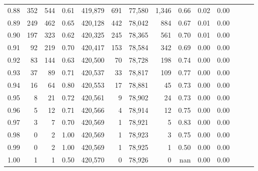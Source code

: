 \begin{tabular}{rrrrrrrrrrrrrr}
0.88 &     352 &    544 &  0.61 &  419,879 &      691 &  77,580 &   1,346 &  0.66 &  0.02 &      0.00 \\
0.89 &     249 &    462 &  0.65 &  420,128 &      442 &  78,042 &     884 &  0.67 &  0.01 &      0.00 \\
0.90 &     197 &    323 &  0.62 &  420,325 &      245 &  78,365 &     561 &  0.70 &  0.01 &      0.00 \\
0.91 &      92 &    219 &  0.70 &  420,417 &      153 &  78,584 &     342 &  0.69 &  0.00 &      0.00 \\
0.92 &      83 &    144 &  0.63 &  420,500 &       70 &  78,728 &     198 &  0.74 &  0.00 &      0.00 \\
0.93 &      37 &     89 &  0.71 &  420,537 &       33 &  78,817 &     109 &  0.77 &  0.00 &      0.00 \\
0.94 &      16 &     64 &  0.80 &  420,553 &       17 &  78,881 &      45 &  0.73 &  0.00 &      0.00 \\
0.95 &       8 &     21 &  0.72 &  420,561 &        9 &  78,902 &      24 &  0.73 &  0.00 &      0.00 \\
0.96 &       5 &     12 &  0.71 &  420,566 &        4 &  78,914 &      12 &  0.75 &  0.00 &      0.00 \\
0.97 &       3 &      7 &  0.70 &  420,569 &        1 &  78,921 &       5 &  0.83 &  0.00 &      0.00 \\
0.98 &       0 &      2 &  1.00 &  420,569 &        1 &  78,923 &       3 &  0.75 &  0.00 &      0.00 \\
0.99 &       0 &      2 &  1.00 &  420,569 &        1 &  78,925 &       1 &  0.50 &  0.00 &      0.00 \\
1.00 &       1 &      1 &  0.50 &  420,570 &        0 &  78,926 &       0 &   nan &  0.00 &      0.00 \\
\bottomrule
\end{tabular}
